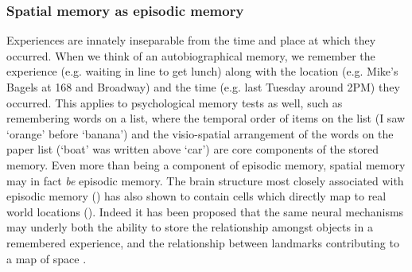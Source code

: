 \subsubsection{Spatial memory as episodic memory}
\label{sec:intro:memory:spatial-episodic}
Experiences are innately inseparable from the time and place at which they occurred.
When we think of an autobiographical memory, we remember the experience (e.g. waiting in line to get lunch) along with the location (e.g. Mike's Bagels at 168 and Broadway) and the time (e.g. last Tuesday around 2PM) they occurred.
This applies to psychological memory tests as well, such as remembering words on a list, where the temporal order of items on the list (I saw `orange' before `banana') and the visio-spatial arrangement of the words on the paper list (`boat' was written above `car') are core components of the stored memory.
Even more than being a component of episodic memory, spatial memory may in fact \emph{be} episodic memory.
The brain structure most closely associated with episodic memory () has also shown to contain cells which directly map to real world locations ().
Indeed it has been proposed that the same neural mechanisms may underly both the ability to store the relationship amongst objects in a remembered experience, and the relationship between landmarks contributing to a map of space \citep{Buzsaki2013}.

